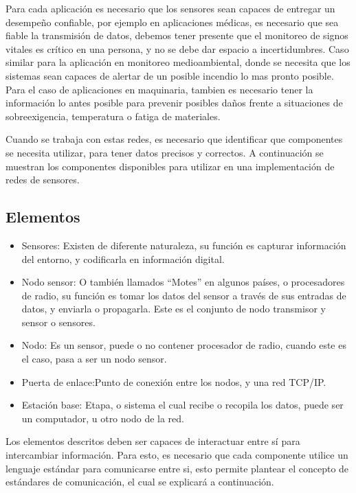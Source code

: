 Para cada aplicación es necesario que los sensores sean capaces de entregar un desempeño confiable, por ejemplo en aplicaciones médicas, es necesario que sea fiable la transmisión de datos, debemos tener presente que el monitoreo de signos vitales es crítico en una persona, y no se debe dar espacio a incertidumbres. Caso similar para la aplicación en monitoreo medioambiental, donde se necesita que los sistemas sean capaces de alertar de un posible incendio lo mas pronto posible. Para el caso de aplicaciones en maquinaria, tambien es necesario tener la información lo antes posible para prevenir posibles daños frente a situaciones de sobreexigencia, temperatura o fatiga de materiales.

Cuando se trabaja con estas redes, es necesario que identificar que componentes se necesita utilizar, para tener datos precisos y correctos. A continuación se muestran los componentes disponibles para utilizar en una implementación de redes de sensores.




\subsection{Elementos}

\begin{itemize}
    \item Sensores: Existen de diferente naturaleza, su función es capturar información del entorno, y codificarla en información digital.
    \item Nodo sensor: O también llamados “Motes” en algunos países, o procesadores de radio, su función es tomar los datos del sensor a través de sus entradas de datos, y enviarla o propagarla. Este es el conjunto de nodo transmisor y sensor o sensores.
    \item Nodo: Es un sensor, puede o no contener procesador de radio, cuando este es el caso, pasa a ser un nodo sensor.
    \item Puerta de enlace:Punto de conexión entre los nodos, y una red TCP/IP.
    \item Estación base: Etapa, o sistema el cual recibe o recopila los datos, puede ser un computador, u otro nodo de la red.
\end{itemize}

 Los elementos descritos deben ser capaces de interactuar entre sí para intercambiar información. Para esto, es necesario que cada componente utilice un lenguaje estándar para comunicarse entre si, esto permite plantear el concepto de estándares de comunicación, el cual se explicará a continuación.



